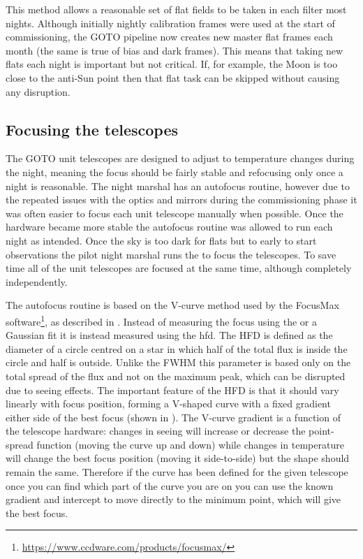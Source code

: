 \begin{colsection}
\begin{colsection}
This method allows a reasonable set of flat fields to be taken in each filter most nights. Although initially nightly calibration frames were used at the start of commissioning, the GOTO pipeline now creates new master flat frames each month (the same is true of bias and dark frames). This means that taking new flats each night is important but not critical. If, for example, the Moon is too close to the anti-Sun point then that flat task can be skipped without causing any disruption.

\end{colsection}

\subsection{Focusing the telescopes}
\label{sec:autofocus}
\begin{colsection}

The GOTO unit telescopes are designed to adjust to temperature changes during the night, meaning the focus should be fairly stable and refocusing only once a night is reasonable. The night marshal has an autofocus routine, however due to the repeated issues with the optics and mirrors during the commissioning phase it was often easier to focus each unit telescope manually when possible. Once the hardware became more stable the autofocus routine was allowed to run each night as intended. Once the sky is too dark for flats but to early to start observations the pilot night marshal runs the  to focus the telescopes. To save time all of the unit telescopes are focused at the same time, although completely independently.

The autofocus routine is based on the V-curve method used by the FocusMax software\footnote{\url{https://www.ccdware.com/products/focusmax/}}, as described in \citet{autofocus}. Instead of measuring the focus using the  or a Gaussian fit it is instead measured using the \gls{hfd}. The HFD is defined as the diameter of a circle centred on a star in which half of the total flux is inside the circle and half is outside. Unlike the FWHM this parameter is based only on the total spread of the flux and not on the maximum peak, which can be disrupted due to seeing effects. The important feature of the HFD is that it should vary linearly with focus position, forming a V-shaped curve with a fixed gradient either side of the best focus (shown in ). The V-curve gradient is a function of the telescope hardware: changes in seeing will increase or decrease the point-spread function (moving the curve up and down) while changes in temperature will change the best focus position (moving it side-to-side) but the shape should remain the same. Therefore if the curve has been defined for the given telescope once you can find which part of the curve you are on you can use the known gradient and intercept to move directly to the minimum point, which will give the best focus.


\end{colsection}
\end{colsection}
